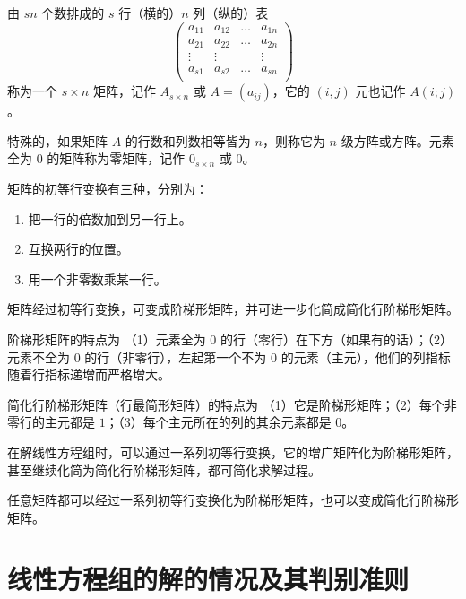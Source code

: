 \begin{definition}
	由 $sn$ 个数排成的 $s$ 行（横的）$n$ 列（纵的）表
	\begin{equation*}
		\left(
		\begin{matrix}
			a_{11} & a_{12} & \ldots & a_{1n} \\
			a_{21} & a_{22} & \ldots & a_{2n} \\
			\vdots & \vdots &        & \vdots \\a_{s1}&a_{s2}&\ldots&a_{sn}\\
		\end{matrix}
		\right)
	\end{equation*}
	称为一个 $s\times n$ 矩阵，记作 $A_{s\times n}$ 或 $A=(a_{ij})$，它的 $(i,j)$ 元也记作 $A(i;j)$。
\end{definition}

特殊的，如果矩阵 $A$ 的行数和列数相等皆为 $n$，则称它为 $n$ 级方阵或方阵。元素全为 $0$ 的矩阵称为零矩阵，记作 $0_{s\times n}$ 或 $0$。

\begin{definition}[初等行变换]
	矩阵的初等行变换有三种，分别为：

	\begin{enumerate}
		\item 把一行的倍数加到另一行上。
		\item 互换两行的位置。
		\item 用一个非零数乘某一行。
	\end{enumerate}
\end{definition}

矩阵经过初等行变换，可变成阶梯形矩阵，并可进一步化简成简化行阶梯形矩阵。

阶梯形矩阵的特点为 （1）元素全为 $0$ 的行（零行）在下方（如果有的话）；（2）元素不全为 $0$ 的行（非零行），左起第一个不为 $0$ 的元素（主元），他们的列指标随着行指标递增而严格增大。

简化行阶梯形矩阵（行最简形矩阵）的特点为 （1）它是阶梯形矩阵；（2）每个非零行的主元都是 $1$；（3）每个主元所在的列的其余元素都是 $0$。

在解线性方程组时，可以通过一系列初等行变换，它的增广矩阵化为阶梯形矩阵，甚至继续化简为简化行阶梯形矩阵，都可简化求解过程。

\begin{theorem}
	任意矩阵都可以经过一系列初等行变换化为阶梯形矩阵，也可以变成简化行阶梯形矩阵。
\end{theorem}

\section{线性方程组的解的情况及其判别准则}


